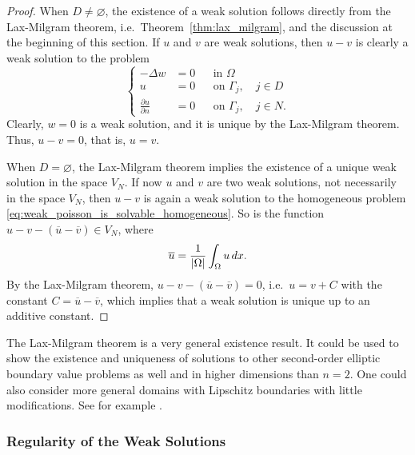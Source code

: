 \documentclass[english, 12pt, a4paper, sci, utf8, a-2b, online]{aaltothesis}
\theoremstyle{definition}
\theoremstyle{plain}
\DeclarePairedDelimiter\abs{\lvert}{\rvert}
\newcommand*\diff{\mathop{}\!d}
\numberwithin{equation}{section}
\begin{document}
\begin{proof}
    When $D \neq \varnothing$, the existence of a weak solution follows
    directly from the Lax-Milgram theorem, i.e.\ Theorem~\ref{thm:lax_milgram},
    and the discussion at the beginning of this section.
    If $u$ and $v$ are weak solutions, then $u-v$ is clearly
    a weak solution to the problem
    \begin{equation}
        \label{eq:weak_poisson_is_solvable_homogeneous}
        \left\{
            \begin{aligned}
                -\Delta w &= 0 && \text{in } \Omega \\
                u &= 0 && \text{on } \Gamma_j, \quad j \in D \\
                \frac{\partial u}{\partial n} &= 0 && \text{on } \Gamma_j,
                \quad j \in N.
            \end{aligned}
        \right.
    \end{equation}
    Clearly, $w = 0$ is a weak solution, and it is unique
    by the Lax-Milgram theorem. Thus, $u - v = 0$, that is, $u = v$.

    When $D = \varnothing$, the Lax-Milgram theorem implies the existence
    of a unique weak solution in the space $V_N$. If now $u$ and $v$ are two
    weak solutions, not necessarily in the space $V_N$, then $u-v$ is again
    a weak solution to the homogeneous problem 
    \eqref{eq:weak_poisson_is_solvable_homogeneous}.
    So is the function $u-v - (\overline{u} - \overline{v}) \in V_N$, where
    \begin{equation*}
        \overline{u} = \frac{1}{\abs{\Omega}} \int_{\Omega} u \diff x.
    \end{equation*}
    By the Lax-Milgram theorem, $u-v-(\overline{u} - \overline{v}) = 0$,
    i.e.\ $u = v + C$ with the constant $C = \overline{u} - \overline{v}$,
    which implies that a weak solution is unique up to an additive constant.
\end{proof}

The Lax-Milgram theorem is a very general existence result.
It could be used to show the existence and uniqueness of solutions
to other second-order elliptic boundary value problems as well
and in higher dimensions than $n=2$. One could also consider more
general domains with Lipschitz boundaries with little modifications.
See for example \cite[Chapter 6]{evans2010}.

\subsubsection{Regularity of the Weak Solutions}
\label{subsubsec:regularity_of_the_weak_solutions}
\end{document}
